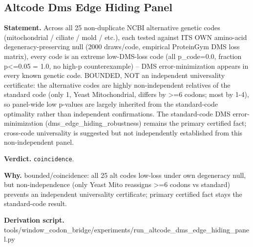 \subsection{Altcode Dms Edge Hiding Panel}\label{sec:bridge-altcode-dms-edge-hiding-panel}
\textbf{Statement.} Across all 25 non-duplicate NCBI alternative genetic codes (mitochondrial / ciliate / mold / etc.),
each tested against ITS OWN amino-acid degeneracy-preserving null (2000 draws/code, empirical
ProteinGym DMS loss matrix), every code is an extreme low-DMS-loss code (all p\_code=0.0, fraction
p<=0.05 = 1.0, no high-p counterexample) -- DMS error-minimization appears in every known genetic
code. BOUNDED, NOT an independent universality certificate: the alternative codes are highly
non-independent relatives of the standard code (only 1, Yeast Mitochondrial, differs by >=6 codons;
most by 1-4), so panel-wide low p-values are largely inherited from the standard-code optimality
rather than independent confirmations. The standard-code DMS error-minimization
(dms\_edge\_hiding\_robustness) remains the primary certified fact; cross-code universality is
suggested but not independently established from this non-independent panel.

\textbf{Verdict.} \texttt{coincidence}.

\textbf{Why.} bounded/coincidence: all 25 alt codes low-loss under own degeneracy null, but non-independence (only
Yeast Mito reassigns >=6 codons vs standard) prevents an independent universality certificate;
primary certified fact stays the standard-code result.

\textbf{Derivation script.} tools/window\_codon\_bridge/experiments/run\_altcode\_dms\_edge\_hiding\_panel.py

